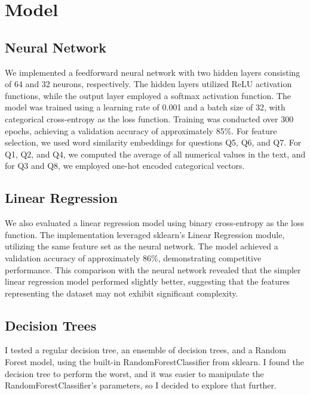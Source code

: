 \section{Model}

\subsection{Neural Network}
We implemented a feedforward neural network with two hidden layers consisting of 64 and 32 neurons, respectively. The hidden layers utilized ReLU activation functions, while the output layer employed a softmax activation function. The model was trained using a learning rate of 0.001 and a batch size of 32, with categorical cross-entropy as the loss function. Training was conducted over 300 epochs, achieving a validation accuracy of approximately 85\%. For feature selection, we used word similarity embeddings for questions Q5, Q6, and Q7. For Q1, Q2, and Q4, we computed the average of all numerical values in the text, and for Q3 and Q8, we employed one-hot encoded categorical vectors.

\subsection{Linear Regression}
We also evaluated a linear regression model using binary cross-entropy as the loss function. The implementation leveraged sklearn's Linear Regression module, utilizing the same feature set as the neural network. The model achieved a validation accuracy of approximately 86\%, demonstrating competitive performance. This comparison with the neural network revealed that the simpler linear regression model performed slightly better, suggesting that the features representing the dataset may not exhibit significant complexity.

\subsection{Decision Trees}
I tested a regular decision tree, an ensemble of decision trees, and a Random Forest model, using the built-in RandomForestClassifier from sklearn. I found the decision tree to perform the worst, and it was easier to manipulate the RandomForestClassifier’s parameters, so I decided to explore that further.

